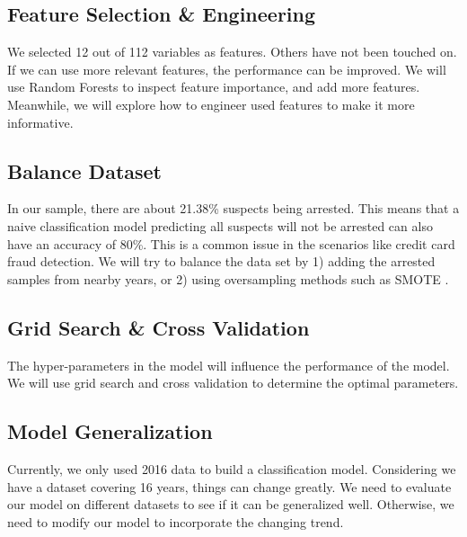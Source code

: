 \documentclass[letterpaper, twocolumn]{article}
\begin{document}
\subsection{Feature Selection \& Engineering}
We selected 12 out of 112 variables as features. Others have not been touched on. If we can use more relevant features, the performance can be improved. We will use Random Forests to inspect feature importance, and add more features. Meanwhile, we will explore how to engineer used features to make it more informative.

\subsection{Balance Dataset}
In our sample, there are about 21.38\% suspects being arrested. This means that a naive classification model predicting all suspects will not be arrested can also have an accuracy of 80\%. This is a common issue in the scenarios like credit card fraud detection. We will try to balance the data set by 1) adding the arrested samples from nearby years, or 2) using oversampling methods such as SMOTE \cite{chawla2002smote}.

\subsection{Grid Search \& Cross Validation}
The hyper-parameters in the model will influence the performance of the model. We will use grid search and cross validation to determine the optimal parameters.


\subsection{Model Generalization}
Currently, we only used 2016 data to build a classification model. Considering we have a dataset covering 16 years, things can change greatly. We need to evaluate our model on different datasets to see if it can be generalized well. Otherwise, we need to modify our model to incorporate the changing trend.


% 
{}
\end{document}
